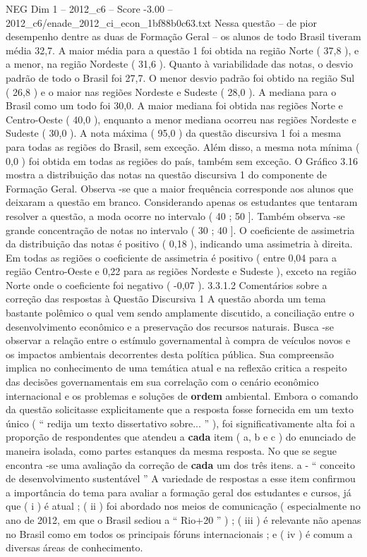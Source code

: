 \begin{textsample}{NEG Dim 1 – 2012\_c6 – Score -3.00 – 2012\_c6/enade\_2012\_ci\_econ\_1bf88b0c63.txt}
Nessa questão – de pior desempenho dentre as duas de Formação Geral – os alunos de todo Brasil tiveram média 32,7.
A maior média para a questão 1 foi obtida na região Norte ( 37,8 ), e a menor, na região Nordeste ( 31,6 ).
Quanto à variabilidade das notas, o desvio padrão de todo o Brasil foi 27,7.
O menor desvio padrão foi obtido na região Sul ( 26,8 ) e o maior nas regiões Nordeste e Sudeste ( 28,0 ).
A mediana para o Brasil como um todo foi 30,0.
A maior mediana foi obtida nas regiões Norte e Centro-Oeste ( 40,0 ), enquanto a menor mediana ocorreu nas regiões Nordeste e Sudeste ( 30,0 ).
A nota máxima ( 95,0 ) da questão discursiva 1 foi a mesma para todas as regiões do Brasil, sem exceção.
Além disso, a mesma nota mínima ( 0,0 ) foi obtida em todas as regiões do país, também sem exceção.
O Gráfico 3.16 mostra a distribuição das notas na questão discursiva 1 do componente de Formação Geral.
Observa -se que a maior frequência corresponde aos alunos que deixaram a questão em branco.
Considerando apenas os estudantes que tentaram resolver a questão, a moda ocorre no intervalo ( 40 ; 50 ].
Também observa -se grande concentração de notas no intervalo ( 30 ; 40 ].
O coeficiente de assimetria da distribuição das notas é positivo ( 0,18 ), indicando uma assimetria à direita.
Em todas as regiões o coeficiente de assimetria é positivo ( entre 0,04 para a região Centro-Oeste e 0,22 para as regiões Nordeste e Sudeste ), exceto na região Norte onde o coeficiente foi negativo ( -0,07 ). 3.3.1.2 Comentários sobre a correção das respostas à Questão Discursiva 1 A questão aborda um tema bastante polêmico o qual vem sendo amplamente discutido, a conciliação entre o desenvolvimento econômico e a preservação dos recursos naturais.
Busca -se observar a relação entre o estímulo governamental à compra de veículos novos e os impactos ambientais decorrentes desta política pública.
Sua compreensão implica no conhecimento de uma temática atual e na reflexão critica a respeito das decisões governamentais em sua correlação com o cenário econômico internacional e os problemas e soluções de \textbf{ordem} ambiental.
Embora o comando da questão solicitasse explicitamente que a resposta fosse fornecida em um texto único ( “ redija um texto dissertativo sobre... ” ), foi significativamente alta foi a proporção de respondentes que atendeu a \textbf{cada} item ( a, b e c ) do enunciado de maneira isolada, como partes estanques da mesma resposta.
No que se segue encontra -se uma avaliação da correção de \textbf{cada} um dos três itens. a - “ conceito de desenvolvimento sustentável ” A variedade de respostas a esse item confirmou a importância do tema para avaliar a formação geral dos estudantes e cursos, já que ( i ) é atual ; ( ii ) foi abordado nos meios de comunicação ( especialmente no ano de 2012, em que o Brasil sediou a “ Rio+20 ” ) ; ( iii ) é relevante não apenas no Brasil como em todos os principais fóruns internacionais ; e ( iv ) é comum a diversas áreas de conhecimento.

\end{textsample}
